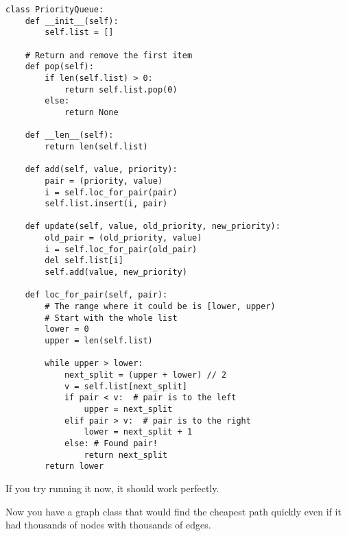 \begin{verbatim}
class PriorityQueue:
    def __init__(self):
        self.list = []
    
    # Return and remove the first item
    def pop(self):
        if len(self.list) > 0:
            return self.list.pop(0)
        else:
            return None
        
    def __len__(self):
        return len(self.list)
    
    def add(self, value, priority):
        pair = (priority, value)
        i = self.loc_for_pair(pair)
        self.list.insert(i, pair)

    def update(self, value, old_priority, new_priority):
        old_pair = (old_priority, value)
        i = self.loc_for_pair(old_pair)
        del self.list[i]
        self.add(value, new_priority)
    
    def loc_for_pair(self, pair):
        # The range where it could be is [lower, upper)
        # Start with the whole list
        lower = 0
        upper = len(self.list)

        while upper > lower:
            next_split = (upper + lower) // 2
            v = self.list[next_split]    
            if pair < v:  # pair is to the left
                upper = next_split
            elif pair > v:  # pair is to the right
                lower = next_split + 1
            else: # Found pair!
                return next_split
        return lower
\end{verbatim}

If you try running it now, it should work perfectly.

Now you have a graph class that would find the cheapest path quickly
even if it had thousands of nodes with thousands of edges.
